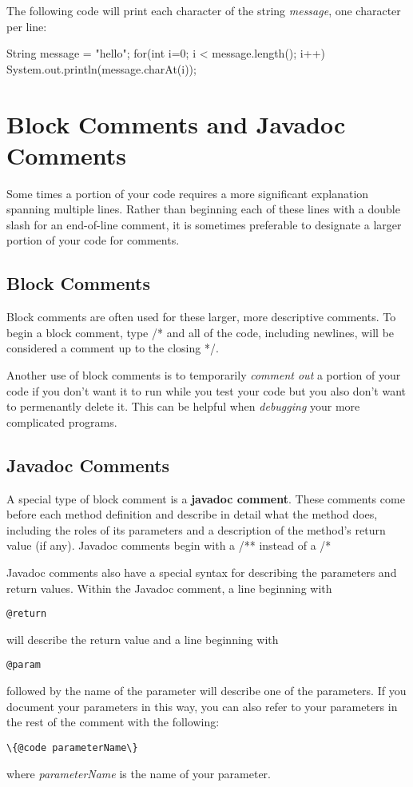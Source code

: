 \begin{exa}
The following code will print each character of the string \textit{message}, one character per line:

\begin{code}
String message = "hello";
for(int i=0; i < message.length(); i++) {
  System.out.println(message.charAt(i));
}
\end{code}

\end{exa}


\section{Block Comments and Javadoc Comments}

Some times a portion of your code requires a more significant explanation spanning multiple lines. Rather than beginning each of these lines with a double slash for an end-of-line comment, it is sometimes preferable to designate a larger portion of your code for comments. 

\subsection{Block Comments}

Block comments are often used for these larger, more descriptive comments. To begin a block comment, type /* and all of the code, including newlines, will be considered a comment up to the closing */.

Another use of block comments is to temporarily \textit{comment out} a portion of your code if you don't want it to run while you test your code but you also don't want to permenantly delete it. This can be helpful when \textit{debugging} your more complicated programs. 

\subsection{Javadoc Comments}
A special type of block comment is a \textbf{javadoc comment}. These comments come before each method definition and describe in detail what the method does, including the roles of its parameters and a description of the method's return value (if any). Javadoc comments begin with a /** instead of a /*

Javadoc comments also have a special syntax for describing the parameters and return values. Within the Javadoc comment, a line beginning with \begin{verbatim}@return\end{verbatim} will describe the return value and a line beginning with \begin{verbatim}@param\end{verbatim} followed by the name of the parameter will describe one of the parameters. If you document your parameters in this way, you can also refer to your parameters in the rest of the comment with the following: \begin{verbatim}\{@code parameterName\}\end{verbatim} where \textit{parameterName} is the name of your parameter. 

